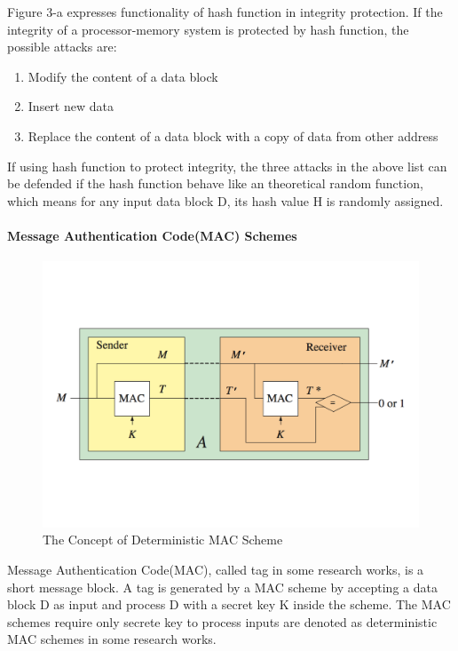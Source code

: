 \documentclass{article}
\begin{document}
Figure 3-a expresses functionality of hash function in integrity protection.
If the integrity of a processor-memory system is protected by hash function, the possible attacks are:
\begin{enumerate}
	\item Modify the content of a data block
	\item Insert new data
	\item Replace the content of a data block with a copy of data from other address
\end{enumerate}
If using hash function to protect integrity, the three attacks in the above list can be defended if the hash function behave like an theoretical random function, which means for any input data block D, its hash value H is randomly assigned.

\paragraph{Message Authentication Code(MAC) Schemes}
\begin{figure}[htbp]
\centering
\includegraphics[scale=0.4]{./diagrams/MAC.pdf}
\caption{The Concept of Deterministic MAC Scheme}
\label{deterministic_mac }
\end{figure}

Message Authentication Code(MAC), called tag in some research works, is a short message block. A tag is generated by a MAC scheme by accepting a data block D as input and process D with a secret key K inside the scheme. The MAC schemes require only secrete key to process inputs are denoted as deterministic MAC schemes in some research works.
\end{document}
